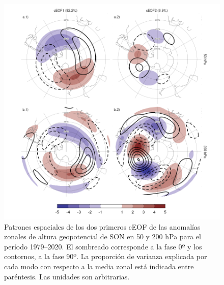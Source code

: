 \documentclass[12pt,oneside,a4paper]{reedthesis}
\begin{document}
\begin{figure}

{\centering \includegraphics{figures/20-ceofs/ceofs-1-1} 

}

\caption{Patrones espaciales de los dos primeros cEOF de las anomalías zonales de altura geopotencial de SON en 50 y 200 hPa para el período 1979--2020. El sombreado corresponde a la fase 0º y los contornos, a la fase 90º. La proporción de varianza explicada por cada modo con respecto a la media zonal está indicada entre paréntesis. Las unidades son arbitrarias.}\label{fig:ceofs-1}
\end{figure}
\end{document}
